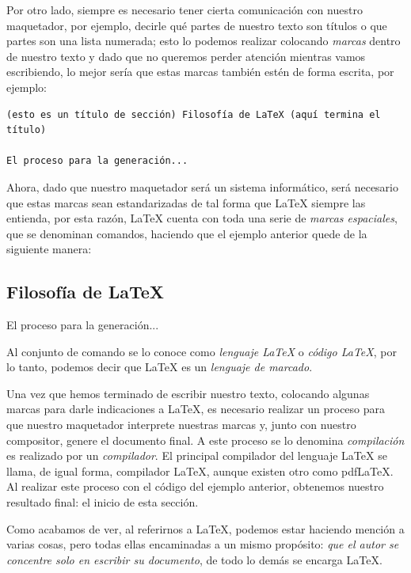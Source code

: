 \documentclass[a4,11pt]{aleph-notas-alpha}
\begin{document}
Por otro lado, siempre es necesario tener cierta comunicación con nuestro maquetador, por ejemplo, decirle qué partes de nuestro texto son títulos o que partes son una lista numerada; esto lo podemos realizar colocando \textit{marcas} dentro de nuestro texto y dado que no queremos perder atención mientras vamos escribiendo, lo mejor sería que estas marcas también estén de forma escrita, por ejemplo:
\begin{tcbcodigo}\begin{lstlisting}
(esto es un título de sección) Filosofía de LaTeX (aquí termina el título)

El proceso para la generación...   
\end{lstlisting}\end{tcbcodigo} 

Ahora, dado que nuestro maquetador será un sistema informático, será necesario que estas marcas sean estandarizadas de tal forma que \LaTeX{} siempre las entienda, por esta razón, \LaTeX{} cuenta con toda una serie de \textit{marcas espaciales}, que se denominan comandos, haciendo que el ejemplo anterior quede de la siguiente manera:
\begin{tcbLaTeX}
\section{Filosofía de LaTeX}

El proceso para la generación...
\end{tcbLaTeX}
Al conjunto de comando se lo conoce como \textit{lenguaje \LaTeX{}} o \textit{código \LaTeX{}}, por lo tanto, podemos decir que \LaTeX{} es un \textit{lenguaje de marcado}.

Una vez que hemos terminado de escribir nuestro texto, colocando algunas marcas para darle indicaciones a \LaTeX{}, es necesario realizar un proceso para que nuestro maquetador interprete nuestras marcas y, junto con nuestro compositor, genere el documento final. A este proceso se lo denomina \textit{compilación} es realizado por un \textit{compilador}. El principal compilador del lenguaje \LaTeX{} se llama, de igual forma, compilador \LaTeX{}, aunque existen otro como pdf\LaTeX. Al realizar este proceso con el código del ejemplo anterior, obtenemos nuestro resultado final: el inicio de esta sección.

Como acabamos de ver, al referirnos a \LaTeX{}, podemos estar haciendo mención a varias cosas, pero todas ellas encaminadas a un mismo propósito: \textit{que el autor se concentre solo en escribir su documento}, de todo lo demás se encarga \LaTeX{}.
\end{document}
